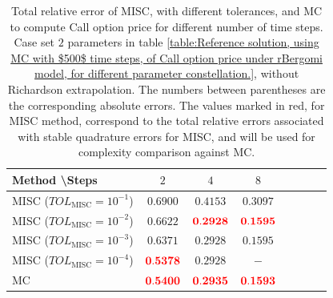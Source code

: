 \begin{table}[htbp]
	\centering
	\begin{tabular}{l*{6}{c}r}
		Method \textbackslash  Steps            & $2$ & $4$ & $8$   \\
		\hline
		MISC ($TOL_{\text{MISC}}=10^{-1}$)  & $\mathbf{
			0.6900}$& $\mathbf{    
			0.4153}$ & $\mathbf{     
			0.3097
		}$   \\
		MISC ($TOL_{\text{MISC}}=10^{-2}$)  & $\mathbf{ 
			0.6622}$ & $\mathbf{  {\color{red} 
				0.2928
			}
		}$ & $\mathbf{ {\color{red}    0.1595}}$   \\
		MISC ($TOL_{\text{MISC}}=10^{-3}$)        & $\mathbf{
			0.6371}$  &  $\mathbf{
			0.2928
		}$ &  $\mathbf{    0.1595}$ \\
		MISC ($TOL_{\text{MISC}}=10^{-4}$)        & $\mathbf{       {\color{red}0.5378}}$  & $\mathbf{
			0.2928
		}$  &  $-$ \\
		\hline
		MC    & $\mathbf{{\color{red}    0.5400}}$  & $\mathbf{{\color{red}0.2935}
		}$  &$\mathbf{{\color{red}
				0.1593}}$  \\	
		
		\hline
	\end{tabular}
	\caption{Total relative error of MISC, with different tolerances, and MC to compute Call option price  for different number of time steps. Case  set $2$ parameters in table \ref{table:Reference solution, using MC with $500$ time steps, of Call option price under rBergomi model, for different parameter constellation.}, without Richardson extrapolation. The numbers between parentheses are the corresponding absolute errors. The values marked in red, for MISC method, correspond to the total relative errors associated with  stable quadrature errors for MISC, and will be used for complexity comparison against MC.}
	\label{Total error of MISC and MC to compute Call option price of the different tolerances for different number of time steps. Case $K=1$, $H=0.07$, without Richardson extrapolation. The numbers between parentheses are the corresponding absolute errors,linear}
\end{table}
\FloatBarrier

